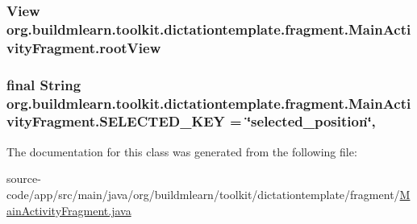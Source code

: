 \subsubsection[{\texorpdfstring{root\+View}{rootView}}]{\setlength{\rightskip}{0pt plus 5cm}View org.\+buildmlearn.\+toolkit.\+dictationtemplate.\+fragment.\+Main\+Activity\+Fragment.\+root\+View\hspace{0.3cm}{\ttfamily [private]}}\hypertarget{classorg_1_1buildmlearn_1_1toolkit_1_1dictationtemplate_1_1fragment_1_1MainActivityFragment_a4c87f9970fc336a7eb56e455167731ae}{}\label{classorg_1_1buildmlearn_1_1toolkit_1_1dictationtemplate_1_1fragment_1_1MainActivityFragment_a4c87f9970fc336a7eb56e455167731ae}
\subsubsection[{\texorpdfstring{S\+E\+L\+E\+C\+T\+E\+D\+\_\+\+K\+EY}{SELECTED_KEY}}]{\setlength{\rightskip}{0pt plus 5cm}final String org.\+buildmlearn.\+toolkit.\+dictationtemplate.\+fragment.\+Main\+Activity\+Fragment.\+S\+E\+L\+E\+C\+T\+E\+D\+\_\+\+K\+EY = \char`\"{}selected\+\_\+position\char`\"{}\hspace{0.3cm}{\ttfamily [static]}, {\ttfamily [private]}}\hypertarget{classorg_1_1buildmlearn_1_1toolkit_1_1dictationtemplate_1_1fragment_1_1MainActivityFragment_a3ea745d0af973fba04b0f88338e7806b}{}\label{classorg_1_1buildmlearn_1_1toolkit_1_1dictationtemplate_1_1fragment_1_1MainActivityFragment_a3ea745d0af973fba04b0f88338e7806b}


The documentation for this class was generated from the following file\+:\begin{DoxyCompactItemize}
\item 
source-\/code/app/src/main/java/org/buildmlearn/toolkit/dictationtemplate/fragment/\hyperlink{dictationtemplate_2fragment_2MainActivityFragment_8java}{Main\+Activity\+Fragment.\+java}\end{DoxyCompactItemize}
